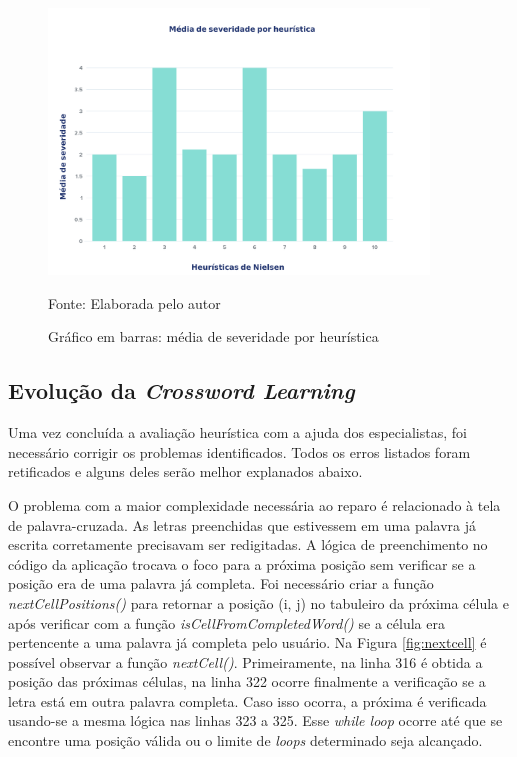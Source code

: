 \begin{figure}[H]
\centering
    \caption{Gráfico em barras: média de severidade por heurística}
    \label{fig:barra-media-heuristica}
    \includegraphics[width=0.9\textwidth]{Figuras/severidade-heuristica.png}
    
    Fonte: Elaborada pelo autor
\end{figure}

\subsection{Evolução da \textit{Crossword Learning}}
Uma vez concluída a avaliação heurística com a ajuda dos especialistas, foi necessário corrigir os problemas identificados. Todos os erros listados foram retificados e alguns deles serão melhor explanados abaixo.

O problema com a maior complexidade necessária ao reparo é relacionado à tela de palavra-cruzada. As letras preenchidas que estivessem em uma palavra já escrita corretamente precisavam ser redigitadas. A lógica de preenchimento no código da aplicação trocava o foco para a próxima posição sem verificar se a posição era de uma palavra já completa. Foi necessário criar a função \textit{nextCellPositions()} para retornar a posição (i, j) no tabuleiro da próxima célula e após verificar com a função \textit{isCellFromCompletedWord()} se a célula era pertencente a uma palavra já completa pelo usuário. Na Figura \ref{fig:nextcell} é possível observar a função \textit{nextCell()}. Primeiramente, na linha 316 é obtida a posição das próximas células, na linha 322 ocorre finalmente a verificação se a letra está em outra palavra completa. Caso isso ocorra, a próxima é verificada usando-se a mesma lógica nas linhas 323 a 325. Esse \textit{while loop} ocorre até que se encontre uma posição válida ou o limite de \textit{loops} determinado seja alcançado.

